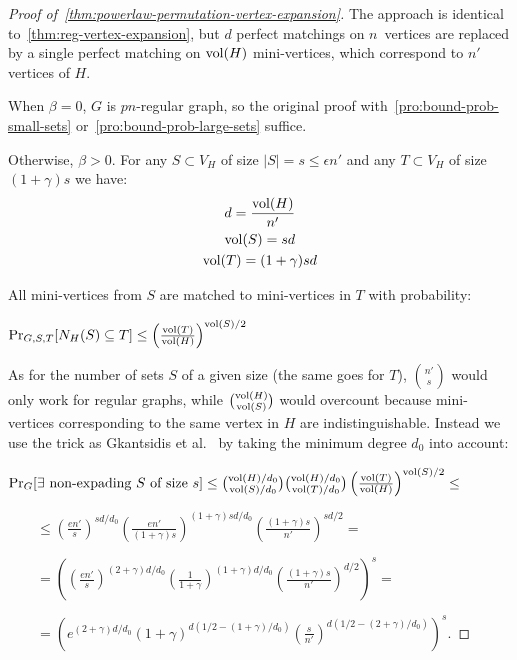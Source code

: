 \begin{proof}[Proof of~\autoref{thm:powerlaw-permutation-vertex-expansion}]
    \label{prf:powerlaw-permutation-vertex-expansion}
    The approach is identical to~\autoref{thm:reg-vertex-expansion},
    but $d$ perfect matchings on $n$~vertices
    are replaced by a single perfect matching on $\operatorname*{vol}(H)$ mini-vertices,
    which correspond to $n'$ vertices of $H$.
    
    When $\beta=0$, $G$ is $pn$-regular graph, so the original proof
    with~\autoref{pro:bound-prob-small-sets}
    or~\autoref{pro:bound-prob-large-sets} suffice.
    
    Otherwise, $\beta>0$.
    For any $S\subset V_H$ of size $|S|=s\leq\epsilon n'$
    and any $T\subset V_H$ of size $(1+\gamma)s$ we have:
    \begin{gather}
        d=\frac{\operatorname*{vol}(H)}{n'}\\
        \operatorname*{vol}(S)=sd\\
        \operatorname*{vol}(T)=(1+\gamma)sd
    \end{gather}
    
    All mini-vertices from $S$ are matched to mini-vertices in $T$ with probability:
    
    $\Pr_{G,S,T}[N_H(S)\subseteq T]\leq\left(\frac{\operatorname*{vol}(T)}{\operatorname*{vol}(H)}\right)^{\operatorname*{vol}(S)/2}$
    
    As for the number of sets $S$ of a given size (the same goes for $T$),
    $\binom{n'}{s}$ would only work for regular graphs,
    while $\binom{\operatorname*{vol}(H)}{\operatorname*{vol}(S)}$ would overcount because mini-vertices
    corresponding to the same vertex in $H$ are indistinguishable.
    Instead we use the trick as Gkantsidis et al.~\cite{gms03} by taking
    the minimum degree $d_0$ into account:
    
    $\Pr_G[\exists\text{ non-expading }S\text{ of size }s]
    \leq\binom{\operatorname*{vol}(H)/d_0}{\operatorname*{vol}(S)/d_0}
    \binom{\operatorname*{vol}(H)/d_0}{\operatorname*{vol}(T)/d_0}
    \left(\frac{\operatorname*{vol}(T)}{\operatorname*{vol}(H)}\right)^{\operatorname*{vol}(S)/2}\leq$
    
    $\qquad\leq\left(\frac{en'}{s}\right)^{sd/d_0}
    \left(\frac{en'}{(1+\gamma)s}\right)^{(1+\gamma)sd/d_0}
    \left(\frac{(1+\gamma)s}{n'}\right)^{sd/2}=$
    
    $\qquad=\left(
        \left(\frac{en'}{s}\right)^{(2+\gamma)d/d_0}
        \left(\frac{1}{1+\gamma}\right)^{(1+\gamma)d/d_0}
        \left(\frac{(1+\gamma)s}{n'}\right)^{d/2}
    \right)^s=$
    
    $\qquad=\left(
        e^{(2+\gamma)d/d_0}
        (1+\gamma)^{d(1/2-(1+\gamma)/d_0)}
        \left(\frac{s}{n'}\right)^{d(1/2-(2+\gamma)/d_0)}
    \right)^s$.
    

\end{proof}
